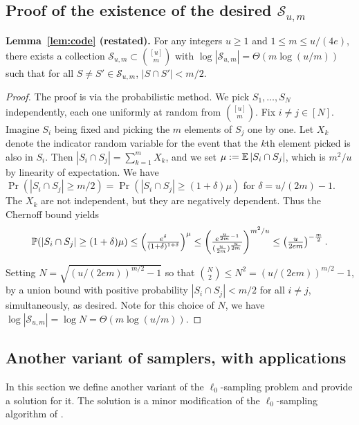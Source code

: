 \subsection{Proof of the existence of the desired $\mathcal S_{u,m}$}\label{sec:code}
\noindent \textbf{Lemma~\ref{lem:code} (restated).}
For any integers $u\ge 1$ and $1\le m\le u/(4e)$, there exists a collection $\mathcal S_{u,m} \subset \binom{[u]}m$ with $\log |\mathcal{S}_{u,m}| = \Theta(m\log(u/m))$ such that for all $S\neq S'\in \mathcal S_{u,m}$, $|S\cap S'| < m/2$.
\begin{proof}
The proof is via the probabilistic method. We pick $S_1,\ldots,S_N$ independently, each one uniformly at random from $\binom{[u]}m$. Fix $i\neq j\in[N]$. Imagine $S_i$ being fixed and picking the $m$ elements of $S_j$ one by one. Let $X_k$ denote the indicator random variable for the event that the $k$th element picked is also in $S_i$. Then $|S_i\cap S_j| = \sum_{k=1}^m X_k$, and we set $\mu:= \operatorname*{\mathbb{E}} |S_i\cap S_j|$, which is $m^2/u$ by linearity of expectation. We have $\Pr(|S_i \cap S_j| \ge m/2) = \Pr(|S_i\cap S_j| \ge (1+\delta)\mu)$ for $\delta = u/(2m) - 1$. The $X_k$ are not independent, but they are negatively dependent. Thus the Chernoff bound yields
\begin{equation}
$$
\Pr(|S_i\cap S_j| \ge (1+\delta)\mu) \le \left(\frac{e^{\delta}}{(1+\delta)^{1+\delta}}\right)^\mu \le \left(\frac{e^{\frac u{2m} - 1}}{(\frac u{2m})^{\frac u{2m}}}\right)^{m^2/u} \le \left(\frac u{2em}\right)^{-\frac m2} .
$$
\end{equation}

Setting $N = \sqrt{(u/(2em))^{m/2} - 1}$ so that ${N \choose 2}\leq N^2=(u/(2em))^{m/2} - 1$, by a union bound with positive probability $|S_i\cap S_j| < m/2$ for all $i\neq j$, simultaneously, as desired. Note for this choice of $N$, we have $\log|\mathcal S_{u,m}| = \log N = \Theta(m\log(u/m))$.
\end{proof}

\subsection{Another variant of samplers, with applications}\label{sec:variant}

In this section we define another variant of the $\ell_0$-sampling problem and provide a solution for it. The solution is a minor modification of the $\ell_0$-sampling algorithm of \cite{JowhariST11}.

